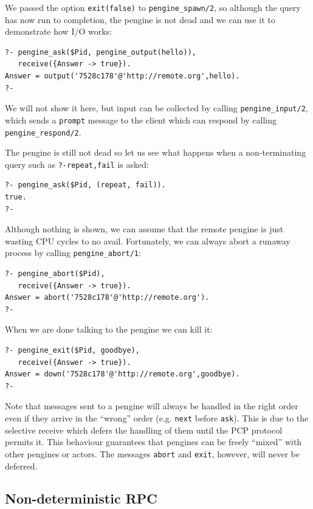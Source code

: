 \documentclass{tlp}
\begin{document}
We passed the option \texttt{exit(false)} to \texttt{pengine\_spawn/2}, so although the query has now run to completion, the pengine is not dead and we can use it to demonstrate how I/O works:

\begin{lstlisting}
?- pengine_ask($Pid, pengine_output(hello)),
   receive({Answer -> true}).
Answer = output('7528c178'@'http://remote.org',hello).
?-
\end{lstlisting}

\noindent We will not show it here, but input can be collected by calling \texttt{pengine\_input/2}, which sends a \texttt{prompt} message to the client which can respond by calling \texttt{pengine\_respond/2}. 

\noindent The pengine is still not dead so let us see what happens when a non-terminating query such as \texttt{?-repeat,fail} is asked:

\begin{lstlisting}
?- pengine_ask($Pid, (repeat, fail)).
true.
?-
\end{lstlisting}

\noindent Although nothing is shown, we can assume that the remote pengine is just wasting CPU cycles to no avail. Fortunately, we can always abort a runaway process by calling \texttt{pengine\_abort/1}:

\begin{lstlisting}
?- pengine_abort($Pid),
   receive({Answer -> true}).
Answer = abort('7528c178'@'http://remote.org').
?-
\end{lstlisting}

\noindent When we are done talking to the pengine we can kill it:

\begin{lstlisting}
?- pengine_exit($Pid, goodbye),
   receive({Answer -> true}).
Answer = down('7528c178'@'http://remote.org',goodbye).
?-
\end{lstlisting}

\noindent Note that messages sent to a pengine will always be handled in the right order even if they arrive in the ``wrong'' order (e.g. \texttt{next} before \texttt{ask}). This is due to the selective receive which defers the handling of them until the PCP protocol permits it. This behaviour guarantees that pengines can be freely ``mixed'' with other pengines or actors. The messages \texttt{abort} and \texttt{exit}, however, will never be deferred.

\subsection{Non-deterministic RPC}\label{sec:ndrpc} 
\end{document}
